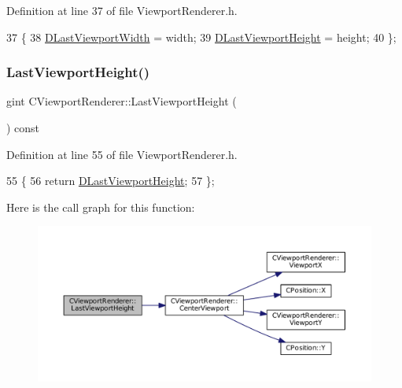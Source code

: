 Definition at line 37 of file Viewport\+Renderer.\+h.


\begin{DoxyCode}
37                                                           \{
38             \hyperlink{classCViewportRenderer_aaa21acd1b43badc3c1a3b0bf9b0f86f9}{DLastViewportWidth} = width;
39             \hyperlink{classCViewportRenderer_aaca5c330615fc2aacc57dede8e7c18b0}{DLastViewportHeight} = height;
40         \};
\end{DoxyCode}
\hypertarget{classCViewportRenderer_a55bdef4acd6335ac15f5017ad82111b3}{}\label{classCViewportRenderer_a55bdef4acd6335ac15f5017ad82111b3} 
\subsubsection{\texorpdfstring{Last\+Viewport\+Height()}{LastViewportHeight()}}
{\footnotesize\ttfamily gint C\+Viewport\+Renderer\+::\+Last\+Viewport\+Height (\begin{DoxyParamCaption}{ }\end{DoxyParamCaption}) const\hspace{0.3cm}{\ttfamily [inline]}}



Definition at line 55 of file Viewport\+Renderer.\+h.


\begin{DoxyCode}
55                                        \{
56             \textcolor{keywordflow}{return} \hyperlink{classCViewportRenderer_aaca5c330615fc2aacc57dede8e7c18b0}{DLastViewportHeight};
57         \};
\end{DoxyCode}
Here is the call graph for this function\+:
\nopagebreak
\begin{figure}[H]
\begin{center}
\leavevmode
\includegraphics[width=350pt]{classCViewportRenderer_a55bdef4acd6335ac15f5017ad82111b3_cgraph}
\end{center}
\end{figure}
\hypertarget{classCViewportRenderer_a4d87305e8c2da6933d13c9a98d80bb21}{}\label{classCViewportRenderer_a4d87305e8c2da6933d13c9a98d80bb21} 
